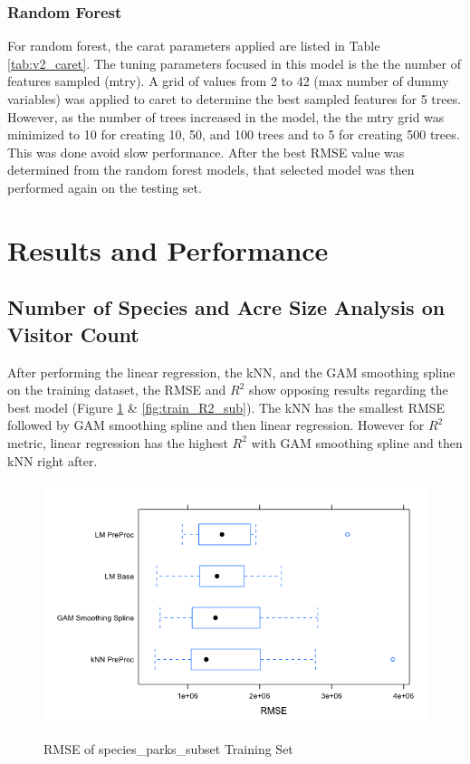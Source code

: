 \documentclass[stu, floatsintext, 11pt]{apa7}
\begin{document}
\subsubsection{Random Forest}
For random forest, the carat parameters applied are listed in Table \ref{tab:v2_caret}. The tuning parameters focused in this model is the the number of features sampled (mtry). A grid of values from 2 to 42 (max number of dummy variables) was applied to caret to determine the best sampled features for 5 trees. However, as the number of trees increased in the model, the the mtry grid was minimized to 10 for creating 10, 50, and 100 trees and to 5 for creating 500 trees. This was done avoid slow performance. After the best RMSE value was determined from the random forest models, that selected model was then performed again on the testing set.

\section{Results and Performance}

\subsection{Number of Species and Acre Size Analysis on Visitor Count}
After performing the linear regression, the kNN, and the GAM smoothing spline on the training dataset, the RMSE and $R^2$ show opposing results regarding the best model (Figure \ref{fig:train_RMSE_sub} \& \ref{fig:train_R2_sub}). The kNN has the smallest RMSE followed by GAM smoothing spline and then linear regression. However for $R^2$ metric, linear regression has the highest $R^2$ with GAM smoothing spline and then kNN right after.

\begin{figure}[h!]
\centering
\caption{RMSE of species\_parks\_subset Training Set}
\includegraphics[scale=0.6]{images/train_RMSE_subset.png}
\label{fig:train_RMSE_sub}
\end{figure}
\end{document}
